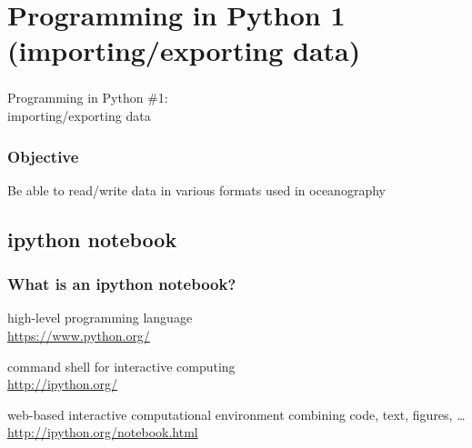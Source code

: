 \section{Programming in Python 1 (importing/exporting data)}

{
\begin{frame}
\frametitle{}
{\fontsize{50}{60}\selectfont Programming in Python \#1:\\
importing/exporting data} 

\end{frame}
}

\begin{frame}
\frametitle{Objective}

Be able to read/write data in various formats used in oceanography

\vfill 


\end{frame}

\subsection{ipython notebook}

\begin{frame}[c]
\frametitle{What is an ipython notebook?}


\begin{description}
\item<2->[Python:] high-level programming language\\ 
\url{https://www.python.org/}
\item<3->[IPython:] command shell for interactive computing\\ 
\url{http://ipython.org/}
\item<4->[IPython notebook:] web-based interactive computational environment combining code, text, figures, \ldots\\
\url{http://ipython.org/notebook.html}
\end{description}

\end{frame}

